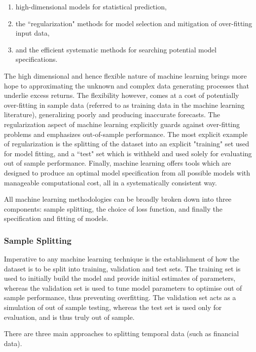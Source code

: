 \documentclass[11pt, a4paper, table]{article}
\begin{document}
\begin{enumerate}
	\item high-dimensional models for statistical prediction, 
	\item the ``regularization" methods for model selection and mitigation of over-fitting input data, 
	\item and the efficient systematic methods for searching potential model specifications.
\end{enumerate}

The high dimensional and hence flexible nature of machine learning brings more hope to approximating the unknown and complex data generating processes that underlie excess returns. The flexibility however, comes at a cost of potentially over-fitting in sample data (referred to as training data in the machine learning literature), generalizing poorly and producing inaccurate forecasts. The regularization aspect of machine learning explicitly guards against over-fitting problems and emphasizes out-of-sample performance. The most explicit example of regularization is the splitting of the dataset into an explicit "training" set used for model fitting, and a ``test" set which is withheld and used solely for evaluating out of sample performance. Finally, machine learning offers tools which are designed to produce an optimal model specification from all possible models with manageable computational cost, all in a systematically consistent way. 

All machine learning methodologies can be broadly broken down into three components: sample splitting, the choice of loss function, and finally the specification and fitting of models.

\subsubsection{Sample Splitting}
\label{sample_split}

Imperative to any machine learning technique is the establishment of how the dataset is to be split into training, validation and test sets. The training set is used to initially build the model and provide initial estimates of parameters, whereas the validation set is used to tune model parameters to optimise out of sample performance, thus preventing overfitting. The validation set acts as a simulation of out of sample testing, whereas the test set is used only for evaluation, and is thus truly out of sample.

There are three main approaches to splitting temporal data (such as financial data). 
\end{document}
